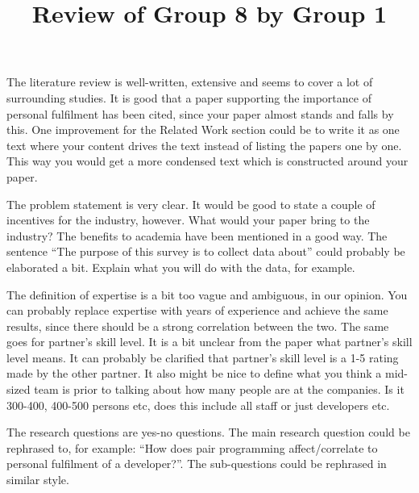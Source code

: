 \documentclass[times, 10pt,twocolumn]{IEEEtran}
\begin{document}
\title{Review of Group 8 by Group 1}

\author{


}


\maketitle
\thispagestyle{empty}







The literature review is well-written, extensive and seems to cover a lot of surrounding studies. It is good that a paper supporting the importance of personal fulfilment has been cited, since your paper almost stands and falls by this. One improvement for the Related Work section could be to write it as one text where your content drives the text instead of listing the papers one by one. This way you would get a more condensed text which is constructed around your paper. 

The problem statement is very clear. It would be good to state a couple of incentives for the industry, however. What would your paper bring to the industry? The benefits to academia have been mentioned in a good way. The sentence ``The purpose of this survey is to collect data about'' could probably be elaborated a bit. Explain what you will do with the data, for example. 

The definition of expertise is a bit too vague and ambiguous, in our opinion. You can probably replace expertise with years of experience and achieve the same results, since there should be a strong correlation between the two. The same goes for partner's skill level. It is a bit unclear from the paper what partner's skill level means. It can probably be clarified that partner's skill level is a 1-5 rating made by the other partner. It also might be nice to define what you think a mid-sized team is prior to talking about how many people are at the companies. Is it 300-400, 400-500 persons etc, does this include all staff or just developers etc.


The research questions are yes-no questions. The main research question could be rephrased to, for example: ``How does pair programming affect/correlate to personal fulfilment of a developer?''. The sub-questions could be rephrased in similar style. 
\end{document}

